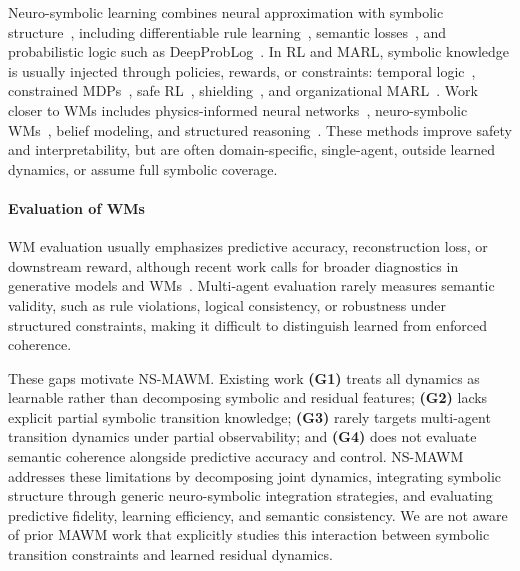 \documentclass{article}
\theoremstyle{plain}
\theoremstyle{definition}
\theoremstyle{remark}
\begin{document}
Neuro-symbolic learning combines neural approximation with symbolic structure~\cite{bhuyan2024}, including differentiable rule learning~\cite{Fan2017differentiablelearninglogicalrules}, semantic losses~\cite{Xu2018semanticloss}, and probabilistic logic such as DeepProbLog~\cite{manhaeve2018deepproblog}. In RL and MARL, symbolic knowledge is usually injected through policies, rewards, or constraints: temporal logic~\cite{katz2018ltl}, constrained MDPs~\cite{altman1999cmdp}, safe RL~\cite{achiam2017cpo}, shielding~\cite{alshiekh2018shield}, and organizational MARL~\cite{soule2025moisemarl}. Work closer to WMs includes physics-informed neural networks~\cite{raissi2019pinn}, neuro-symbolic WMs~\cite{balloch2023neurosymbolicworldmodelsadapting}, belief modeling, and structured reasoning~\cite{agravante-etal-2023-learning, perspective2025neurosymbolic}. These methods improve safety and interpretability, but are often domain-specific, single-agent, outside learned dynamics, or assume full symbolic coverage.

\paragraph{Evaluation of WMs}

WM evaluation usually emphasizes predictive accuracy, reconstruction loss, or downstream reward, although recent work calls for broader diagnostics in generative models and WMs~\cite{Duan_2025_ICCV,Delvecchio2025p1157}. Multi-agent evaluation rarely measures semantic validity, such as rule violations, logical consistency, or robustness under structured constraints, making it difficult to distinguish learned from enforced coherence.

\medskip

These gaps motivate NS-MAWM. Existing work \textbf{(G1)} treats all dynamics as learnable rather than decomposing symbolic and residual features; \textbf{(G2)} lacks explicit partial symbolic transition knowledge; \textbf{(G3)} rarely targets multi-agent transition dynamics under partial observability; and \textbf{(G4)} does not evaluate semantic coherence alongside predictive accuracy and control. NS-MAWM addresses these limitations by decomposing joint dynamics, integrating symbolic structure through generic neuro-symbolic integration strategies, and evaluating predictive fidelity, learning efficiency, and semantic consistency. We are not aware of prior MAWM work that explicitly studies this interaction between symbolic transition constraints and learned residual dynamics.
\end{document}
